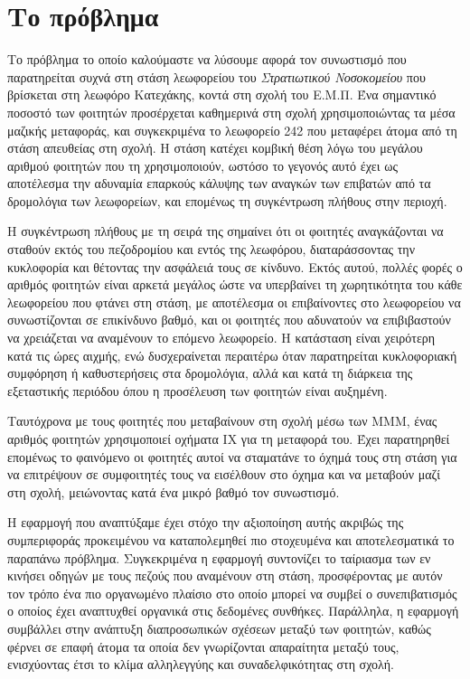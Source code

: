 \documentclass[../thesis.tex]{subfiles}
\begin{document}
\section{Το πρόβλημα}
Το πρόβλημα το οποίο καλούμαστε να λύσουμε αφορά τον συνωστισμό που παρατηρείται συχνά στη στάση λεωφορείου του \textit{Στρατιωτικού Νοσοκομείου} που βρίσκεται στη λεωφόρο Κατεχάκης, κοντά στη σχολή του Ε.Μ.Π.
Ένα σημαντικό ποσοστό των φοιτητών προσέρχεται καθημερινά στη σχολή χρησιμοποιώντας τα μέσα μαζικής μεταφοράς, και συγκεκριμένα το λεωφορείο 242 που μεταφέρει άτομα από τη στάση απευθείας στη σχολή.
Η στάση κατέχει κομβική θέση λόγω του μεγάλου αριθμού φοιτητών που τη χρησιμοποιούν, ωστόσο το γεγονός αυτό έχει ως αποτέλεσμα την αδυναμία επαρκούς κάλυψης των αναγκών των επιβατών από τα δρομολόγια των λεωφορείων, και επομένως τη συγκέντρωση πλήθους στην περιοχή.

Η συγκέντρωση πλήθους με τη σειρά της σημαίνει ότι οι φοιτητές αναγκάζονται να σταθούν εκτός του πεζοδρομίου και εντός της λεωφόρου, διαταράσσοντας την κυκλοφορία και θέτοντας την ασφάλειά τους σε κίνδυνο.
Εκτός αυτού, πολλές φορές ο αριθμός φοιτητών είναι αρκετά μεγάλος ώστε να υπερβαίνει τη χωρητικότητα του κάθε λεωφορείου που φτάνει στη στάση, με αποτέλεσμα οι επιβαίνοντες στο λεωφορείου να συνωστίζονται σε επικίνδυνο βαθμό, και οι φοιτητές που αδυνατούν να επιβιβαστούν να χρειάζεται να αναμένουν το επόμενο λεωφορείο.
Η κατάσταση είναι χειρότερη κατά τις ώρες αιχμής, ενώ δυσχεραίνεται περαιτέρω όταν παρατηρείται κυκλοφοριακή συμφόρηση ή καθυστερήσεις στα δρομολόγια, αλλά και κατά τη διάρκεια της εξεταστικής περιόδου όπου η προσέλευση των φοιτητών είναι αυξημένη.

Ταυτόχρονα με τους φοιτητές που μεταβαίνουν στη σχολή μέσω των ΜΜΜ, ένας αριθμός φοιτητών χρησιμοποιεί οχήματα ΙΧ για τη μεταφορά του.
Έχει παρατηρηθεί επομένως το φαινόμενο οι φοιτητές αυτοί να σταματάνε το όχημά τους στη στάση για να επιτρέψουν σε συμφοιτητές τους να εισέλθουν στο όχημα και να μεταβούν μαζί στη σχολή, μειώνοντας κατά ένα μικρό βαθμό τον συνωστισμό.

Η εφαρμογή που αναπτύξαμε έχει στόχο την αξιοποίηση αυτής ακριβώς της συμπεριφοράς προκειμένου να καταπολεμηθεί πιο στοχευμένα και αποτελεσματικά το παραπάνω πρόβλημα.
Συγκεκριμένα η εφαρμογή συντονίζει το ταίριασμα των εν κινήσει οδηγών με τους πεζούς που αναμένουν στη στάση, προσφέροντας με αυτόν τον τρόπο ένα πιο οργανωμένο πλαίσιο στο οποίο μπορεί να συμβεί ο συνεπιβατισμός ο οποίος έχει αναπτυχθεί οργανικά στις δεδομένες συνθήκες.
Παράλληλα, η εφαρμογή συμβάλλει στην ανάπτυξη διαπροσωπικών σχέσεων μεταξύ των φοιτητών, καθώς φέρνει σε επαφή άτομα τα οποία δεν γνωρίζονται απαραίτητα μεταξύ τους, ενισχύοντας έτσι το κλίμα αλληλεγγύης και συναδελφικότητας στη σχολή.
\end{document}
